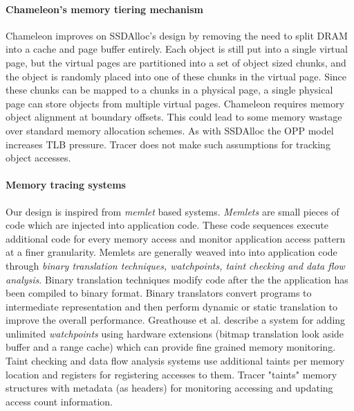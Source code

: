 \paragraph{Chameleon's memory tiering mechanism}
Chameleon improves on SSDAlloc's design by removing the need to split DRAM into a cache and page buffer entirely. Each object is still put into a single virtual page, but the virtual pages are partitioned into a set of object sized chunks, and the object is randomly placed into one of these chunks in the virtual page. Since these chunks can be mapped to a chunks in a physical page, a single physical page can store objects from multiple virtual pages. Chameleon requires memory object alignment at boundary offsets. This could lead to some memory wastage over standard memory allocation schemes. As with SSDAlloc the OPP model increases TLB pressure. Tracer does not make such assumptions for tracking object accesses.

\paragraph{Memory tracing systems}
Our design is inspired from {\emph{memlet}} based systems. {\emph{Memlets}} are small pieces of code which are injected into application code. These code sequences execute additional code for every memory access and monitor application access pattern at  a finer granularity. Memlets are generally weaved into into application code through {\emph{binary translation techniques, watchpoints, taint checking and data flow analysis}}.
Binary translation techniques modify code after the the application has been compiled to binary format. Binary translators {\cite{nethercote2007valgrind,bellard2005qemu}}convert programs to intermediate representation and then perform dynamic or static translation to improve the overall performance. Greathouse et al. \cite{greathouse2012case} describe a system for adding unlimited {\emph{watchpoints}} using hardware extensions (bitmap translation look aside buffer and a range cache) which can provide fine grained memory monitoring. Taint checking \cite{newsome2005dynamic, ho2006practical} and data flow analysis systems use additional taints per memory location and registers for registering accesses to them. Tracer "taints" memory structures with metadata (as headers) for monitoring accessing and updating access count information.

\paragraph{}
